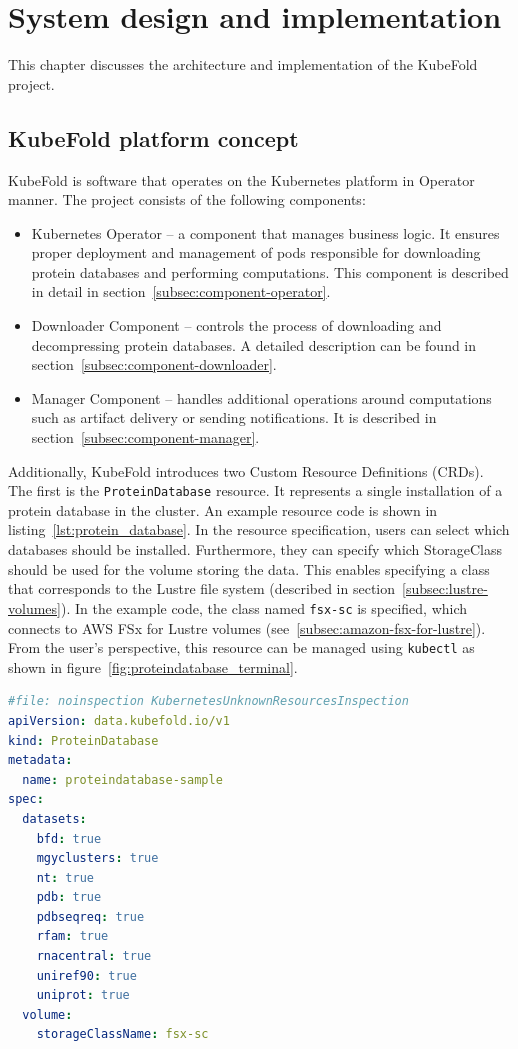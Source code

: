 

\chapter{System design and implementation}
This chapter discusses the architecture and implementation of the KubeFold project.


\section{KubeFold platform concept}
KubeFold is software that operates on the Kubernetes platform in Operator manner.
The project consists of the following components:
\begin{itemize}
    \item Kubernetes Operator -- a component that manages business logic.
    It ensures proper deployment and management of pods responsible for downloading protein databases and performing computations.
    This component is described in detail in section~\ref{subsec:component-operator}.
    \item Downloader Component -- controls the process of downloading and decompressing protein databases.
    A detailed description can be found in section~\ref{subsec:component-downloader}.
    \item Manager Component -- handles additional operations around computations such as artifact delivery or sending notifications.
    It is described in section~\ref{subsec:component-manager}.
\end{itemize}

Additionally, KubeFold introduces two Custom Resource Definitions (CRDs).
The first is the \texttt{ProteinDatabase} resource.
It represents a single installation of a protein database in the cluster.
An example resource code is shown in listing~\ref{lst:protein_database}.
In the resource specification, users can select which databases should be installed.
Furthermore, they can specify which StorageClass should be used for the volume storing the data.
This enables specifying a class that corresponds to the Lustre file system (described in section~\ref{subsec:lustre-volumes}).
In the example code, the class named \texttt{fsx-sc} is specified, which connects to AWS FSx for Lustre volumes (see~\ref{subsec:amazon-fsx-for-lustre}).
From the user's perspective, this resource can be managed using \texttt{kubectl} as shown in figure~\ref{fig:proteindatabase_terminal}.

\begin{lstlisting}[language=yaml,caption={Example \texttt{ProteinDatabase} resource definition},label={lst:protein_database}]
#file: noinspection KubernetesUnknownResourcesInspection
apiVersion: data.kubefold.io/v1
kind: ProteinDatabase
metadata:
  name: proteindatabase-sample
spec:
  datasets:
    bfd: true
    mgyclusters: true
    nt: true
    pdb: true
    pdbseqreq: true
    rfam: true
    rnacentral: true
    uniref90: true
    uniprot: true
  volume:
    storageClassName: fsx-sc
\end{lstlisting}

